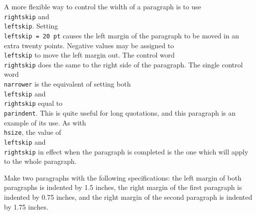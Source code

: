{\narrower 
A more flexible way to control the width of a paragraph is to use 
{\tt \\rightskip} and {\tt \\leftskip}.  Setting {\tt \\leftskip 
= 20 pt} causes the left margin of the paragraph to be moved in 
an extra twenty points. Negative values may be assigned to {\tt 
\\leftskip} to move the left margin out. The control word {\tt 
\\rightskip} does the same to the right side of the paragraph. 
The single control word {\tt \\narrower} is the equivalent of 
setting both {\tt \\leftskip} and {\tt \\rightskip} equal to {\tt 
\\parindent}.  This is quite useful for long quotations, and 
this paragraph is an example of its use. As with {\tt \\hsize}, 
the value of {\tt \\leftskip} and {\tt \\rightskip} in effect 
when the paragraph is completed is the one which will apply to 
the whole paragraph. 

} 

\exercise Make two paragraphs with the following specifications: 
the left margin of both paragraphs is indented by 1.5 inches, 
the right margin of the first paragraph is indented by 0.75 
inches, and the right margin of the second paragraph is indented 
by 1.75 inches. 
\bigskip 

